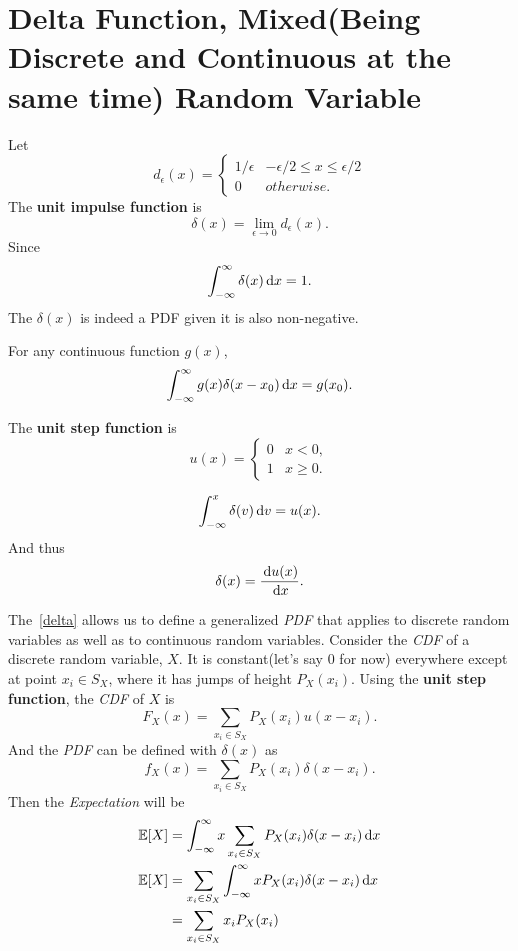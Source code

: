 \section{Delta Function, Mixed(Being Discrete and Continuous at the same time) Random Variable}
\begin{definition}
    Let
    \[d_{\epsilon}(x)={
        \begin{cases}
            1/\epsilon & -\epsilon/2\leq x\leq \epsilon/2 \\
            0 & otherwise.
        \end{cases}
    }\]
    The \textbf{unit impulse function} is 
    \[\delta(x)=\lim_{\epsilon\rightarrow 0}d_{\epsilon}(x).\]
    Since 
    \[\int_{-\infty}^{\infty}\delta(x)\,\mathrm{d} x = 1.\]
    The $\delta(x)$ is indeed a PDF given it is also non-negative.
\end{definition}

\begin{theorem}
    For any continuous function $g(x)$,
    \[\int_{-\infty}^{\infty}g(x)\delta(x-x_0)\,\mathrm{d} x = g(x_0).\]
\end{theorem}

\begin{definition}
    The \textbf{unit step function} is
    \[u(x)={
        \begin{cases}
            0 & x<0, \\
            1 & x\geq 0.
        \end{cases}
    }\]
\end{definition}

\begin{theorem}\label{delta}
    \[\int_{-\infty}^{x}\delta(v)\,\mathrm{d} v = u(x).\]
    And thus
    \[\delta(x)=\frac{\,\mathrm{d} u(x)}{\,\mathrm{d} x}.\]
\end{theorem}

\begin{corollary}
    The~\cref{delta} allows us to define a generalized \emph{PDF} that applies to discrete random variables as well as to continuous random variables. Consider the \emph{CDF} of a discrete random variable, $X$. It is constant(let's say $0$ for now) everywhere except at point $x_i\in S_X$, where it has jumps of height $P_X(x_i)$. Using the \textbf{unit step function}, the \emph{CDF} of $X$ is 
    \[F_X(x)=\sum_{x_i\in S_X} P_X(x_i)u(x-x_i).\]
    And the \emph{PDF} can be defined with $\delta(x)$ as
    \[f_X(x)=\sum_{x_i\in S_X}P_X(x_i)\delta(x-x_i).\]
    Then the \emph{Expectation} will be
    \begin{align*}
        \E{X} &= \int_{-\infty}^{\infty}x\sum_{x_i\in S_X}P_X(x_i)\delta(x-x_i)\diff x \\
        \E{X} &= \sum_{x_i\in S_X}\int_{-\infty}^{\infty}xP_X(x_i)\delta(x-x_i)\diff x \\
        &= \sum_{x_i\in S_X}x_iP_X(x_i)
    \end{align*}
\end{corollary}

